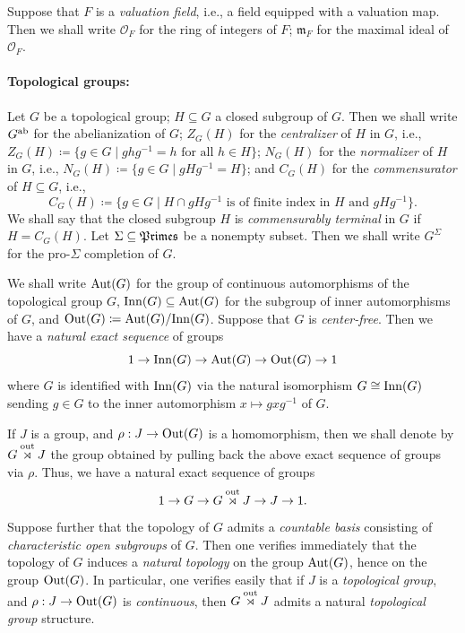 Suppose that $F$ is a \emph{valuation field}, i.e., a field equipped with a valuation map. Then we shall write $\mathcal{O}_F$ for the ring of integers of $F$; $\mathfrak{m}_F$ for the maximal ideal of $\mathcal{O}_F$. 

\paragraph*{Topological groups:}

Let $G$ be a topological group; $H \subseteq G$ a closed subgroup of $G$. Then we shall write $G^{\mathrm{ab}}$ for the abelianization of $G$; $Z_G(H)$ for the \emph{centralizer} of $H$ in $G$, i.e., $Z_G(H) \coloneqq \{g \in G \mid ghg^{-1} = h \text{ for all } h \in H\}$; $N_G(H)$ for the \emph{normalizer} of $H$ in $G$, i.e., $N_G(H) \coloneqq \{g \in G \mid gHg^{-1} = H\}$; and $C_G(H)$ for the \emph{commensurator} of $H \subseteq G$, i.e.,
\[
C_G(H) \coloneqq \{g \in G \mid H \cap gHg^{-1} \text{ is of finite index in } H \text{ and } gHg^{-1}\}.
\]
We shall say that the closed subgroup $H$ is \emph{commensurably terminal} in $G$ if $H = C_G(H)$. Let $\Sigma \subseteq \mathfrak{Primes}$ be a nonempty subset. Then we shall write $G^\Sigma$ for the pro-$\Sigma$ completion of $G$.


We shall write $\mathrm{Aut}(G)$ for the group of continuous automorphisms of the
topological group $G$, $\mathrm{Inn}(G) \subseteq \mathrm{Aut}(G)$ for the subgroup of inner automorphisms of $G$, and $\mathrm{Out}(G) \coloneqq \mathrm{Aut}(G)/\mathrm{Inn}(G)$. Suppose that $G$ is \emph{center-free}. Then we have a \emph{natural exact sequence} of groups
\[1 \to \mathrm{Inn}(G) \to \mathrm{Aut}(G) \to \mathrm{Out}(G) \to 1\]
where $G$ is identified with $\mathrm{Inn}(G)$ via the natural isomorphism $G \cong \mathrm{Inn}(G)$ sending $g \in G$ to the inner automorphism $x \mapsto gxg^{-1}$ of $G$.

If $J$ is a group, and $\rho : J \to \mathrm{Out}(G)$ is a homomorphism, then we shall denote by $G \overset{\mathrm{out}}{\rtimes} J$ the group obtained by pulling back the above exact sequence of groups via $\rho$. Thus, we have a natural exact sequence of groups
\[1 \to G \to G \overset{\mathrm{out}}{\rtimes} J \to J \to 1.\]
Suppose further that the topology of $G$ admits a \emph{countable basis} consisting of \emph{characteristic open subgroups} of $G$. Then one verifies immediately that the topology of $G$ induces a \emph{natural topology} on the group $\mathrm{Aut}(G)$, hence on the group $\mathrm{Out}(G)$. In particular, one verifies easily that if $J$ is a \emph{topological group}, and $\rho : J \to \mathrm{Out}(G)$ is \emph{continuous}, then $G \overset{\mathrm{out}}{\rtimes} J$ admits a natural \emph{topological group} structure.

